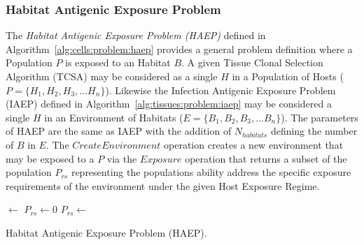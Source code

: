 %
%
\subsubsection{Habitat Antigenic Exposure Problem}
The \emph{Habitat Antigenic Exposure Problem (HAEP)} defined in Algorithm~\ref{alg:cells:problem:haep} provides a general problem definition where a Population $P$ is exposed to an Habitat $B$. A given Tissue Clonal Selection Algorithm (TCSA) may be considered as a single $H$ in a Population of Hosts ($P = \{H_1, H_2, H_3, \ldots H_n\}$). Likewise the Infection Antigenic Exposure Problem (IAEP) defined in Algorithm~\ref{alg:tissues:problem:iaep} may be considered a single $H$ in an Environment of Habitats ($E = \{B_1, B_2, B_3, \ldots B_n\}$). The parameters of HAEP are the same as IAEP with the addition of $N_{habitats}$ defining the number of $B$ in $E$. The $CreateEnvironment$ operation creates a new environment that may be exposed to a $P$ via the $Exposure$ operation that returns a subset of the population $P_{rs}$ representing the populations ability address the specific exposure requirements of the environment under the given Host Exposure Regime.

\begin{algorithm}[ht]		
	\SetLine
	
  
  \Env $\leftarrow$ \;
  $P_{rs} \leftarrow$0\;
	\While{$\neg$\StopCondition{}}
	{
		$P_{rs} \leftarrow$ \Exposure{\Pop, \Env}\;
	} 
	\;
	\caption{Habitat Antigenic Exposure Problem (HAEP).}
	\label{alg:cells:problem:haep}
\end{algorithm}

%
%
